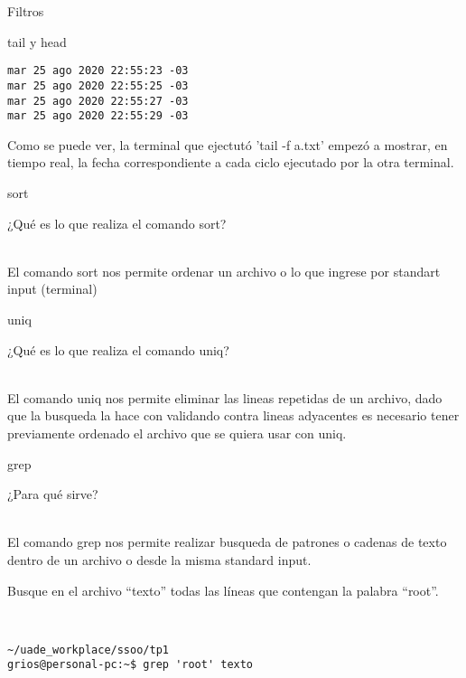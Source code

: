 \begin{section}{Filtros}
\begin{subsection}{tail y head}
\begin{lstlisting}[style=Ubuntu]
mar 25 ago 2020 22:55:23 -03
mar 25 ago 2020 22:55:25 -03
mar 25 ago 2020 22:55:27 -03
mar 25 ago 2020 22:55:29 -03

\end{lstlisting}
Como se puede ver, la terminal que ejectutó 'tail -f a.txt' empezó a mostrar, en tiempo real, la fecha correspondiente a cada ciclo ejecutado por la otra terminal.

\end{subsection}

\begin{subsection}{sort}
\begin{quoting}
¿Qué es lo que realiza el comando sort?
\end{quoting}\\
El comando sort nos permite ordenar un archivo o lo que ingrese por standart input (terminal)

\end{subsection}

\begin{subsection}{uniq}
\begin{quoting}
¿Qué es lo que realiza el comando uniq?
\end{quoting}\\
El comando uniq nos permite eliminar las lineas repetidas de un archivo, dado que la busqueda la hace con validando contra lineas adyacentes es necesario tener previamente ordenado el archivo que se quiera usar con uniq.

\end{subsection}

\begin{subsection}{grep}
\begin{quoting}
¿Para qué sirve?
\end{quoting}\\
El comando grep nos permite realizar busqueda de patrones o cadenas de texto dentro de un archivo o desde la misma standard input.

\begin{quoting}
Busque en el archivo “texto” todas las líneas que contengan la palabra “root”.
\end{quoting}\\
\begin{lstlisting}[style=Ubuntu]
~/uade_workplace/ssoo/tp1
grios@personal-pc:~$ grep 'root' texto


\end{lstlisting}
\end{subsection}
\end{section}
